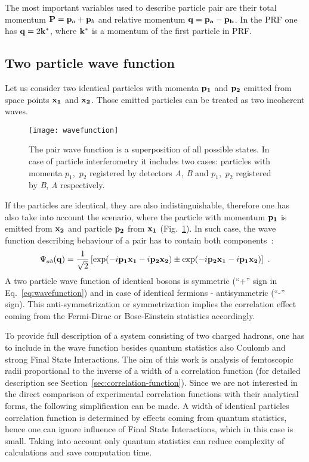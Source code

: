       The most important variables used to describe particle pair are their total momentum $\mathbf{P} = \mathbf{p}_a + \mathbf{p}_b$ and relative momentum $\mathbf{q} = \mathbf{p_a} - \mathbf{p_b}$.
      In the PRF one has $\mathbf{q} = 2 \mathbf{k}^{*}$, where $\mathbf{k}^{*}$ is a momentum of the first particle in PRF.

    \subsection{Two particle wave function}
      Let us consider two identical particles with momenta $\mathbf{p_1}$ and $\mathbf{p_2}$ emitted from space points $\mathbf{x_1}$ and $\mathbf{x_2}$.
      Those emitted particles can be treated as two incoherent waves.
      \begin{figure}[h]
        \centering
        \texttt{[image: wavefunction]}
        \caption{The pair wave function is a superposition of all possible states. In case of particle interferometry it includes two cases: particles with momenta $p_1$,~$p_2$ registered by detectors \textit{A}, \textit{B} and $p_1$,~$p_2$ registered by \textit{B}, \textit{A} respectively.}
        \label{fig:wavefunction}
      \end{figure}
      If the particles are identical, they are also indistinguishable, therefore one has also take into account the scenario, where the particle with momentum $\mathbf{p_1}$ is emitted from $\mathbf{x_2}$ and particle $\mathbf{p_2}$ from $\mathbf{x_1}$ (Fig.~\ref{fig:wavefunction}).
      In such case, the wave function describing behaviour of a pair has to contain both components~\cite{drkisiel}:
      \begin{equation}
      \label{eq:wavefunction}
        \Psi_{ab}(\mathbf{q})=\frac{1}{\sqrt{2}} \left[ \exp(- i \mathbf{p_1}\mathbf{x_1} - i \mathbf{p_2}\mathbf{x_2}) \pm \exp(- i \mathbf{p_2}\mathbf{x_1} - i \mathbf{p_1}\mathbf{x_2}) \right]~.
      \end{equation}
      A two particle wave function of identical bosons is symmetric (``+'' sign in Eq.~\ref{eq:wavefunction}) and in case of identical fermions - antisymmetric (``-'' sign).
      This anti-symmetrization or symmetrization implies the correlation effect coming from the Fermi-Dirac or Bose-Einstein statistics accordingly.

      To provide full description of a system consisting of two charged hadrons, one has to include in the wave function besides quantum statistics also Coulomb and strong Final State Interactions.
      The aim of this work is analysis of femtoscopic radii proportional to the inverse of a width of a correlation function (for detailed description see Section~\ref{sec:correlation-function}).
      Since we are not interested in the direct comparison of experimental correlation functions with their analytical forms, the following simplification can be made.
      A width of identical particles correlation function is determined by effects coming from quantum statistics, hence one can ignore influence of Final State Interactions, which in this case is small. Taking into account only quantum statistics can reduce complexity of calculations and save computation time.
